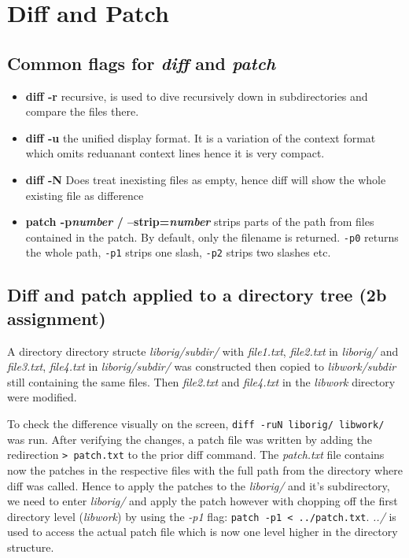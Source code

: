 \documentclass[a4paper,11pt,twoside]{article}
\begin{document}
\section{Diff and Patch}
\subsection{Common flags for \textit{diff} and \textit{patch}}
\begin{itemize}
\item \textbf{diff -r} recursive, is used to dive recursively down in subdirectories and compare the files there.
\item \textbf{diff -u} the unified display format. It is a variation of the context format which omits reduanant context lines hence it is very compact. 
\item \textbf{diff -N} Does treat inexisting files as empty, hence diff will show the whole existing file as difference
\item \textbf{patch -p\textit{number} / --strip=\textit{number}} strips parts of the path from files contained in the patch. By default, only the filename is returned. \verb+-p0+ returns the whole path, \verb+-p1+ strips one slash, \verb+-p2+ strips two slashes etc.  

\end{itemize}


\subsection{Diff and patch applied to a directory tree (2b assignment) }
A directory directory structe \textit{liborig/subdir/} with \textit{file1.txt}, \textit{file2.txt} in \textit{liborig/} and \textit{file3.txt}, \textit{file4.txt} in \textit{liborig/subdir/} was constructed then copied to \textit{libwork/subdir} still containing the same files. Then \textit{file2.txt} and \textit{file4.txt} in the \textit{libwork} directory were modified.

To check the difference visually on the screen, \verb+diff -ruN liborig/ libwork/+ was run. After verifying the changes, a patch file was written by adding the redirection \verb+> patch.txt+ to the prior diff command. The \textit{patch.txt} file contains now the patches in the respective files with the full path from the directory where diff was called. Hence to apply the patches to the \textit{liborig/} and it's subdirectory, we need to enter \textit{liborig/} and apply the patch however with chopping off the first directory level (\textit{libwork}) by using the \textit{-p1} flag: \verb+patch -p1 < ../patch.txt+. \textit{../} is used to access the actual patch file which is now one level higher in the directory structure.
\end{document}
